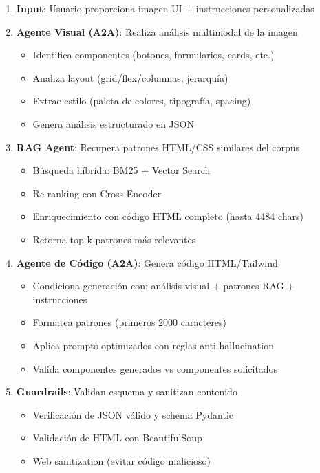 \documentclass[12pt,a4paper]{article}
\begin{document}
\begin{enumerate}
    \item \textbf{Input}: Usuario proporciona imagen UI + instrucciones personalizadas
    
    \item \textbf{Agente Visual (A2A)}: Realiza análisis multimodal de la imagen
    \begin{itemize}
        \item Identifica componentes (botones, formularios, cards, etc.)
        \item Analiza layout (grid/flex/columnas, jerarquía)
        \item Extrae estilo (paleta de colores, tipografía, spacing)
        \item Genera análisis estructurado en JSON
    \end{itemize}
    
    \item \textbf{RAG Agent}: Recupera patrones HTML/CSS similares del corpus
    \begin{itemize}
        \item Búsqueda híbrida: BM25 + Vector Search
        \item Re-ranking con Cross-Encoder
        \item Enriquecimiento con código HTML completo (hasta 4484 chars)
        \item Retorna top-k patrones más relevantes
    \end{itemize}
    
    \item \textbf{Agente de Código (A2A)}: Genera código HTML/Tailwind
    \begin{itemize}
        \item Condiciona generación con: análisis visual + patrones RAG + instrucciones
        \item Formatea patrones (primeros 2000 caracteres)
        \item Aplica prompts optimizados con reglas anti-hallucination
        \item Valida componentes generados vs componentes solicitados
    \end{itemize}
    
    \item \textbf{Guardrails}: Validan esquema y sanitizan contenido
    \begin{itemize}
        \item Verificación de JSON válido y schema Pydantic
        \item Validación de HTML con BeautifulSoup
        \item Web sanitization (evitar código malicioso)
    \end{itemize}
    

\end{enumerate}
\end{document}
